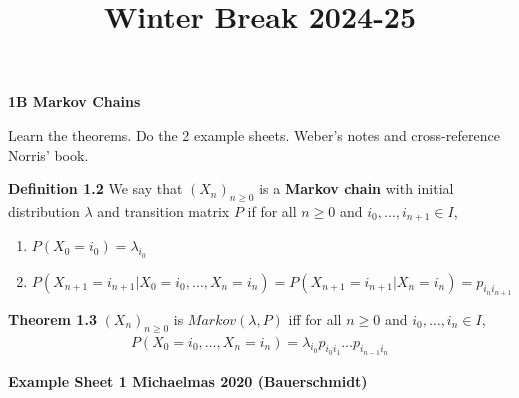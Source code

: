 \documentclass[hidelinks, 12pt]{article}
\title{Winter Break 2024-25}
\date{}
\theoremstyle{mydefstyle}
\theoremstyle{mythmstyle}
\begin{document}
\pagecolor{white}

\textbf{1B Markov Chains}

Learn the theorems. Do the 2 example sheets. Weber's notes and cross-reference Norris' book. 

%
%
%
%
%

\textbf{Definition 1.2} We say that $(X_n)_{n \ge 0}$ is a \textbf{Markov chain} with initial distribution $\lambda$ and transition matrix $P$ if for all $n \ge 0$ and $i_0, \dots, i_{n+1} \in I$,
\begin{enumerate}
\item $P(X_0 = i_0) = \lambda_{i_0}$
\item $P(X_{n+1} = i_{n+1} \vert X_0 = i_0, \dots, X_n = i_n) = P(X_{n+1} = i_{n+1} \vert X_n = i_n) = p_{i_n i_{n+1}}$
\end{enumerate}

\textbf{Theorem 1.3} $(X_n)_{n \ge 0}$ is $Markov(\lambda, P)$ iff for all $n \ge 0$ and $i_0, \dots, i_n \in I$,
\begin{gather*}
P(X_0 = i_0, \dots, X_n = i_n) = \lambda_{i_0}p_{i_0 i_1} \dots p_{i_{n-1} i_n} \tag{1.1}
\end{gather*}

\textbf{Example Sheet 1 Michaelmas 2020 (Bauerschmidt)}
\end{document}
